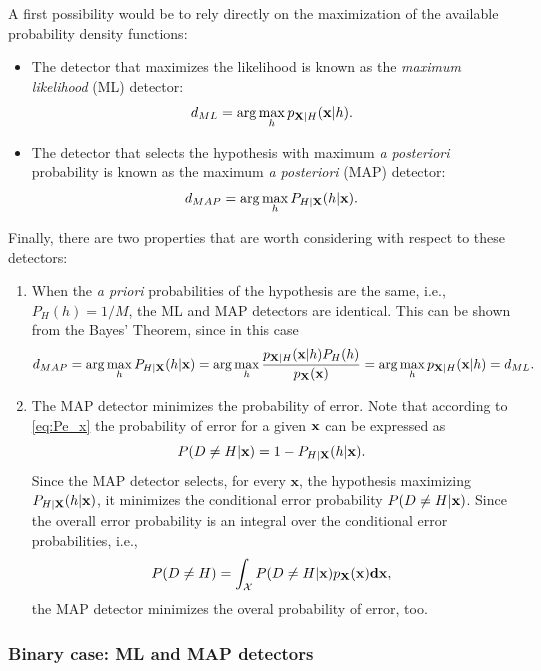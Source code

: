 A first possibility would be to rely directly on the maximization of the available probability density functions:

\begin{itemize}
\item The detector that maximizes the likelihood is known as the {\em maximum likelihood} (ML) detector:
    $$d_{ML} = \arg\max_h p_{{\bf X}|H}({\bf x}|h).$$
\item The detector that selects the hypothesis with maximum {\em a posteriori} probability is known as the  maximum {\em a posteriori} (MAP) detector:
    $$d_{MAP} = \arg\max_h P_{H|{\bf X}}(h|{\bf x}).$$
\end{itemize}

Finally, there are two properties that are worth considering with respect to these detectors:
\begin{enumerate}
    \item When the {\em a priori} probabilities of the hypothesis are the same, i.e., $P_H(h) = 1/M$, the ML and MAP detectors are identical. This can be shown from the Bayes' Theorem, since in this case
    $$d_{MAP} = \arg\max_h P_{H|{\bf X}}(h|{\bf x}) = \arg\max_h \frac{p_{{\bf X}|H}({\bf x}|h) P_H(h)}{p_{\bf X}(\bf x)} = \arg\max_h p_{{\bf X}|H}({\bf x}|h) = d_{ML}.$$
    
    \item The MAP detector minimizes the probability of error. Note that according to \eqref{eq:Pe_x} the probability of error for a given $\bf x$ can be expressed as
    $$P(D\neq H|{\bf x}) = 1 - P_{ H|{\bf X}}(h|{\bf x}).$$
    Since the MAP detector selects, for every $\mathbf{x}$, the hypothesis maximizing $P_{H|{\bf X}}(h|{\bf x})$, it minimizes the conditional error probability $P(D\neq H|{\bf x})$. Since the overall error probability is an integral over the conditional error probabilities, i.e.,
    $$P(D\neq H) = \int_{\mathcal{X}} P(D\neq H|{\bf x}) p_{\bf X}(\bf x) d{\bf x},$$
the MAP detector minimizes the overal probability of error, too.
    
\end{enumerate}

\subsubsection{Binary case: ML and MAP detectors}

